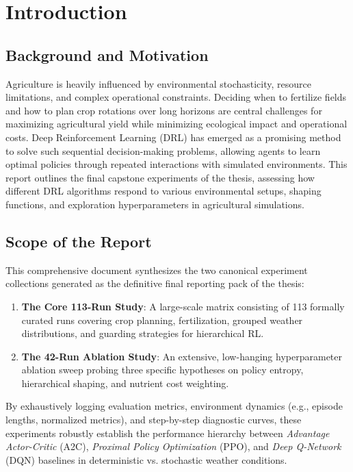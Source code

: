 \chapter{Introduction}
\label{chap:intro}

\section{Background and Motivation}

Agriculture is heavily influenced by environmental stochasticity, resource limitations, and complex operational constraints. Deciding when to fertilize fields and how to plan crop rotations over long horizons are central challenges for maximizing agricultural yield while minimizing ecological impact and operational costs. Deep Reinforcement Learning (DRL) has emerged as a promising method to solve such sequential decision-making problems, allowing agents to learn optimal policies through repeated interactions with simulated environments. This report outlines the final capstone experiments of the thesis, assessing how different DRL algorithms respond to various environmental setups, shaping functions, and exploration hyperparameters in agricultural simulations.

\section{Scope of the Report}

This comprehensive document synthesizes the two canonical experiment collections generated as the definitive final reporting pack of the thesis:
\begin{enumerate}
    \item \textbf{The Core 113-Run Study}: A large-scale matrix consisting of 113 formally curated runs covering crop planning, fertilization, grouped weather distributions, and guarding strategies for hierarchical RL.
    \item \textbf{The 42-Run Ablation Study}: An extensive, low-hanging hyperparameter ablation sweep probing three specific hypotheses on policy entropy, hierarchical shaping, and nutrient cost weighting.
\end{enumerate}

By exhaustively logging evaluation metrics, environment dynamics (e.g., episode lengths, normalized metrics), and step-by-step diagnostic curves, these experiments robustly establish the performance hierarchy between \textit{Advantage Actor-Critic} (A2C), \textit{Proximal Policy Optimization} (PPO), and \textit{Deep Q-Network} (DQN) baselines in deterministic vs. stochastic weather conditions.

